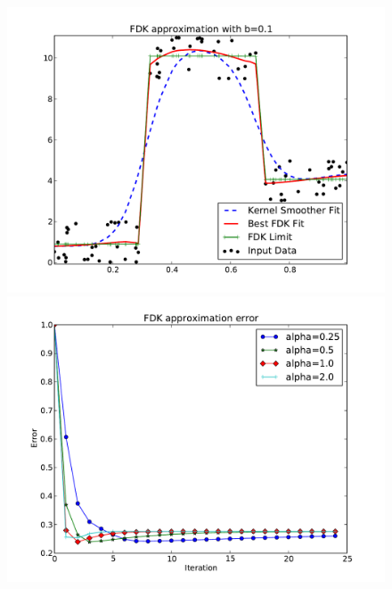 \begin{figure}[!htb]
    \includegraphics[width=\linewidth]{./figs/3step.pdf}
  \endminipage\hfill
    \includegraphics[width=\linewidth]{./figs/3steperr.pdf}
  \endminipage
\end{figure}

